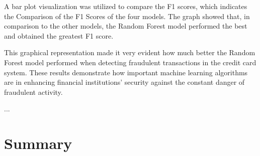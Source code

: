 A bar plot visualization was utilized to compare the F1 scores, which indicates the Comparison of the F1 Scores of the four models. The graph showed that, in comparison to the other models, the Random Forest model performed the best and obtained the greatest F1 score.

This graphical representation made it very evident how much better the Random Forest model performed when detecting fraudulent transactions in the credit card system. These results demonstrate how important machine learning algorithms are in enhancing financial institutions' security against the constant danger of fraudulent activity. 


...





\section{Summary}






